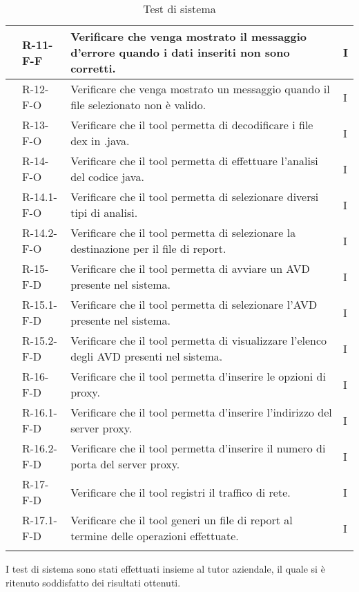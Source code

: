 \begin{center}
\begin{longtable}{ | C{2.5cm} |C{2cm} |C{7cm} |C{1.5cm}|}
         & R-11-F-F   &Verificare che venga mostrato il messaggio d'errore quando i dati inseriti non sono corretti.& I \\\hline
         & R-12-F-O   &Verificare che venga mostrato un messaggio quando il file selezionato non è valido.& I \\\hline
         & R-13-F-O   &Verificare che il tool permetta di decodificare i file dex in .java.& I \\\hline
         & R-14-F-O   &Verificare che il tool permetta di effettuare l'analisi del codice java.& I \\\hline
         & R-14.1-F-O &Verificare che il tool permetta di selezionare diversi tipi di analisi.& I \\\hline
         & R-14.2-F-O &Verificare che il tool permetta di selezionare la destinazione per il file di report.& I \\\hline
         & R-15-F-D   &Verificare che il tool permetta di avviare un AVD presente nel sistema.& I \\\hline
         & R-15.1-F-D &Verificare che il tool permetta di selezionare l'AVD presente nel sistema.& I \\\hline
         & R-15.2-F-D &Verificare che il tool permetta di visualizzare l'elenco degli AVD presenti nel sistema.& I \\\hline
         & R-16-F-D   &Verificare che il tool permetta d'inserire le opzioni di proxy.& I \\\hline
         & R-16.1-F-D &Verificare che il tool permetta d'inserire l'indirizzo del server proxy.& I \\\hline
         & R-16.2-F-D &Verificare che il tool permetta d'inserire il numero di porta del server proxy.& I \\\hline
         & R-17-F-D   &Verificare che il tool registri il traffico di rete.& I \\\hline
         & R-17.1-F-D &Verificare che il tool generi un file di report al termine delle operazioni effettuate.& I \\\hline
        \caption{Test di sistema}
    \end{longtable}
\end{center}
\setcounter{subCount}{0}
\setcounter{rowcount}{0}
I test di sistema sono stati effettuati insieme al tutor aziendale, il quale si è ritenuto soddisfatto dei risultati ottenuti.
